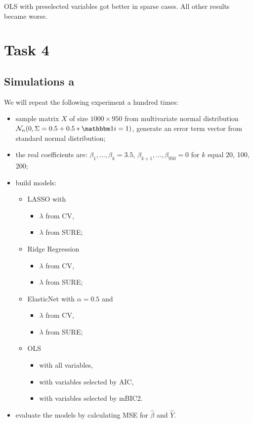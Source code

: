 \documentclass[
]{article}
\begin{document}
OLS with preselected variables got better in sparse cases. All other
results became worse.

\hypertarget{task-4}{%
\section{Task 4}\label{task-4}}

\hypertarget{simulations-a}{%
\subsection{Simulations a}\label{simulations-a}}

We will repeat the following experiment a hundred times:

\begin{itemize}
\item
  sample matrix \(X\) of size \(1000 \times 950\) from multivariate
  normal distribution
  \(\mathcal N_n (0, \Sigma = 0.5 + 0.5*\mathbbm 1 {i=1})\), generate an
  error term vector from standard normal distribution;
\item
  the real coefficients are: \(\beta_1, \ldots, \beta_k = 3.5\),
  \(\beta_{k+1}, \ldots, \beta_{950} = 0\) for \(k\) equal 20, 100, 200;
\item
  build models:

  \begin{itemize}
  \item
    LASSO with

    \begin{itemize}
    \item
      \(\lambda\) from CV,
    \item
      \(\lambda\) from SURE;
    \end{itemize}
  \item
    Ridge Regression

    \begin{itemize}
    \item
      \(\lambda\) from CV,
    \item
      \(\lambda\) from SURE;
    \end{itemize}
  \item
    ElasticNet with \(\alpha=0.5\) and

    \begin{itemize}
    \item
      \(\lambda\) from CV,
    \item
      \(\lambda\) from SURE;
    \end{itemize}
  \item
    OLS

    \begin{itemize}
    \item
      with all variables,
    \item
      with variables selected by AIC,
    \item
      with variables selected by mBIC2.
    \end{itemize}
  \end{itemize}
\item
  evaluate the models by calculating MSE for \(\hat\beta\) and
  \(\hat Y\).
\end{itemize}
\end{document}
